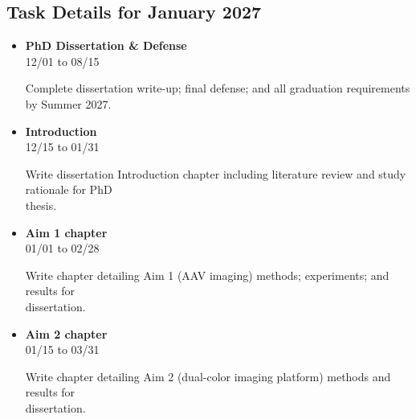 \documentclass[landscape,a4paper]{article}
\begin{document}
\vspace{0.5cm}
\subsection{Task Details for January 2027}
\begin{itemize}[leftmargin=1cm, itemsep=0.8em]
    \item \textcolor{other}{\textbf{PhD Dissertation \& Defense}}\\[0.2em]
          \textcolor{black!70}{\small 12/01 to 08/15}
\\[0.3em]
          \begin{minipage}[t]{0.85\textwidth}
          \textcolor{black!80}{Complete dissertation write-up; final defense; and all graduation requirements by Summer 2027.}
          \end{minipage}

    \item \textcolor{other}{\textbf{Introduction}}\\[0.2em]
          \textcolor{black!70}{\small 12/15 to 01/31}
\\[0.3em]
          \begin{minipage}[t]{0.85\textwidth}
          \textcolor{black!80}{Write dissertation Introduction chapter including literature review and study rationale for PhD\\[0.1em]
          thesis.}
          \end{minipage}

    \item \textcolor{other}{\textbf{Aim 1 chapter}}\\[0.2em]
          \textcolor{black!70}{\small 01/01 to 02/28}
\\[0.3em]
          \begin{minipage}[t]{0.85\textwidth}
          \textcolor{black!80}{Write chapter detailing Aim 1 (AAV imaging) methods; experiments; and results for\\[0.1em]
          dissertation.}
          \end{minipage}

    \item \textcolor{other}{\textbf{Aim 2 chapter}}\\[0.2em]
          \textcolor{black!70}{\small 01/15 to 03/31}
\\[0.3em]
          \begin{minipage}[t]{0.85\textwidth}
          \textcolor{black!80}{Write chapter detailing Aim 2 (dual-color imaging platform) methods and results for\\[0.1em]
          dissertation.}
          \end{minipage}

\end{itemize}
\end{document}

